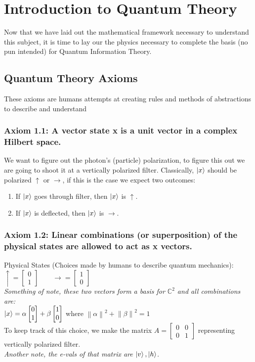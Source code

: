 \documentclass[12pt]{article}
\theoremstyle{plain}
\theoremstyle{nonumberplain}
\theoremstyle{plain}
\theoremstyle{nonumberplain}
\newcommand\1{{\bf 1}}
\newcommand{\bmat}[1]{\begin{bmatrix*} #1 \end{bmatrix*}} %
\newcommand{\C}{\mathbb{C}} %
\newcommand{\<}{\left\langle}
\renewcommand{\>}{\right\rangle}
\newcommand{\norm}[1]{\left\lVert#1\right\rVert} %
\begin{document}
\pagebreak
\section{Introduction to Quantum Theory}
Now that we have laid out the mathematical framework necessary to understand this subject, it is time to lay our the physics necessary to complete the basis (no pun intended) for Quantum Information Theory.  
\subsection{Quantum Theory Axioms}
These axioms are humans attempts at creating rules and methods of abstractions to describe and understand 
\subsubsection{Axiom 1.1: A vector state x is a unit vector in a complex Hilbert space.}
We want to figure out the photon's (particle) polarization, to figure this out we are going to shoot it at a vertically polarized filter.  Classically, $\ket{x}$ should be polarized $\uparrow$ or $\rightarrow$, if this is the case we expect two outcomes: \\
\begin{enumerate}
\item If $\ket{x}$ goes through filter, then $\ket{x}$ is $\uparrow$.
\item If $\ket{x}$ is deflected, then $\ket{x}$ is $\rightarrow$.
\end{enumerate}

\subsubsection{Axiom 1.2: Linear combinations (or superposition) of the physical states are allowed to act as x vectors.}
\begin{center}
Physical States (Choices made by humans to describe quantum mechanics):\\
$\uparrow = \bmat{0 \\1} \qquad \rightarrow = \bmat{1 \\0}$\\
\textit{Something of note, these two vectors form a basis for $\C^2$ and all combinations are:}\\
$\ket{x} = \alpha\bmat{0 \\1} + \beta\bmat{1 \\0}$ where $\norm{\alpha}^2 + \norm{\beta}^2 = 1$\\
To keep track of this choice, we make the matrix $A = \bmat{ 0 &0\\ 0 &1}$ representing vertically polarized filter.\\
\textit{Another note, the e-vals of that matrix are $\ket{v}, \ket{h}$.}
\end{center}
\end{document}

